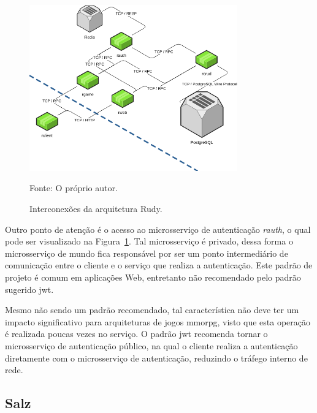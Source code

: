 \begin{figure}[htb!]
  \caption{Interconexões da arquitetura Rudy.}
  \label{fig:interconexao_rudy}
  \includegraphics[width=0.8\textwidth]{figuras/interconexoes/rudy.png}
  \centering

  Fonte: O próprio autor.
\end{figure}

Outro ponto de atenção é o acesso ao microsserviço de autenticação \textit{rauth}, o qual pode ser visualizado na Figura~\ref{fig:interconexao_rudy}.
%
Tal microsserviço é privado, dessa forma o microsserviço de mundo fica responsável por ser um ponto intermediário de comunicação entre o cliente e o serviço que realiza a autenticação.
%
Este padrão de projeto é comum em aplicações Web, entretanto não recomendado pelo padrão sugerido  \ac{jwt}.

%
Mesmo não sendo um padrão recomendado, tal característica não deve ter um impacto significativo para arquiteturas de jogos \ac{mmorpg}, visto que esta operação é realizada poucas vezes no serviço.
%
O padrão \ac{jwt} recomenda tornar o microsserviço de autenticação público, na qual o cliente realiza a autenticação diretamente com o microsserviço de autenticação, reduzindo o tráfego interno de rede.


%



\subsection{Salz}
\label{sec:inter_salz}



